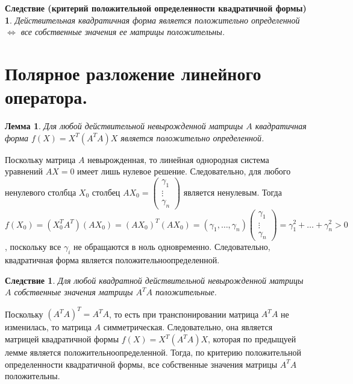 \newtheorem*{cor14_7}{Следствие (критерий положительной определенности квадратичной формы)}\begin{cor14_7}Действительная квадратичная форма является положительно определенной $\Longleftrightarrow$ все собственные значения ее матрицы положительны.
\end{cor14_7}





\section{Полярное разложение линейного оператора.}
\newtheorem*{lem14_8_1}{Лемма}\begin{lem14_8_1}Для любой действительной невырожденной матрицы $A$ квадратичная форма $f(X) = X^T(A^TA)X$ является положительно определенной.
\end{lem14_8_1}\begin{Proof}
	Поскольку матрица $A$ невырожденная, то линейная однородная система уравнений $AX = 0$ имеет лишь нулевое решение. Следовательно, для любого ненулевого столбца $X_0$ столбец $AX_0 = \begin{pmatrix}
		\gamma_1\\
		\vdots\\
		\gamma_n
	\end{pmatrix}$ является ненулевым. Тогда $f(X_0) = (X_0^TA^T)(AX_0) = (AX_0)^T(AX_0) = (\gamma_1,\dots,\gamma_n)\begin{pmatrix}
		\gamma_1\\
		\vdots\\
		\gamma_n
	\end{pmatrix} = \gamma_1^2 + \ldots + \gamma_n^2 > 0$, поскольку все $\gamma_i$ не обращаются в ноль одновременно. Следовательно, квадратичная форма является положительноопределенной.
\end{Proof}
\newtheorem*{cor14_8_1}{Следствие}\begin{cor14_8_1}Для любой квадратной действительной невырожденной матрицы $A$ собственные значения матрицы $A^TA$ положительные.
\end{cor14_8_1}\begin{Proof}
	Поскольку $(A^TA)^T = A^TA$, то есть при транспонировании матрица $A^TA$ не изменилась, то матрица $A$ симметрическая. Следовательно, она является матрицей квадратичной формы $f(X) = X^T(A^TA)X$, которая по предыщуей лемме является положительноопределенной. Тогда, по критерию положительной определенности квадратичной формы, все собственные значения матрицы $A^TA$ положительны.
\end{Proof}
